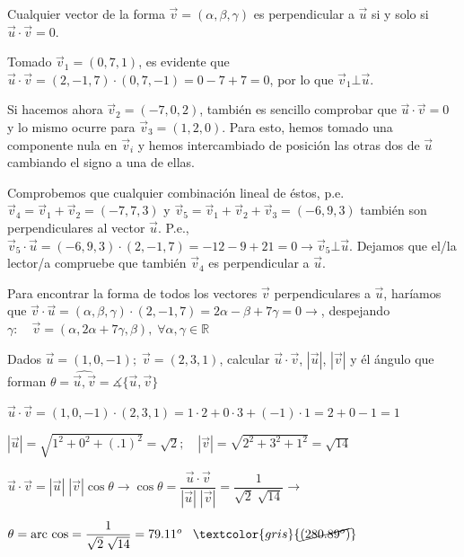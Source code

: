 \begin{proofw}\renewcommand{\qedsymbol}{$\diamond$}
	Cualquier vector de la forma $\vec v=(\alpha, \beta, \gamma)$ es perpendicular a $\vec u$ si y solo si $\vec u \cdot \vec v=0$.
	
	Tomado $\vec v_1=(0, 7, 1)$, es evidente que  $\vec u \cdot \vec v=(2,-1,7)\cdot (0,7,-1)=0-7+7=0$, por lo que $\vec v_1 \bot \vec u$.
	
	Si hacemos ahora  $\vec v_2=(-7,0,2)$, también es sencillo comprobar que $\vec u \cdot \vec v=0$ y lo mismo ocurre para $\vec v_3=(1,2,0)$. \textcolor{gris}{Para esto, hemos tomado una componente nula en $\vec v_i$ y hemos intercambiado de posición las otras dos de $\vec u$ cambiando el signo a una de ellas.}
	
	Comprobemos que cualquier combinación lineal de éstos, p.e. $\vec v_4=\vec v_1+\vec v_2=(-7,7,3)$ y $\vec v_5=\vec v_1+\vec v_2+\vec v_3=(-6,9,3)$ también son perpendiculares al vector $\vec u$. P.e., $\vec v_5 \cdot \vec u=(-6,9,3)\cdot (2,-1,7)=-12-9+21=0 \to \vec v_5 \bot \vec u$. Dejamos que el/la lector/a compruebe que también $\vec v_4$ es perpendicular a $\vec u$.
	
	\textcolor{gris}{Para encontrar la forma de todos los vectores $\vec v$ perpendiculares a $\vec u$, haríamos que $\vec v \cdot \vec u=(\alpha, \beta, \gamma)\cdot (2,-1,7)=2\alpha-\beta+7\gamma=0 \to$, despejando $\gamma: \quad  \vec v=(\alpha, 2\alpha+7\gamma, \beta),\; \forall \alpha, \gamma \in \mathbb R$}
\end{proofw}


\begin{ejre}
	Dados $\vec u=(1,0,-1); \; \vec v=(2,3,1)$, calcular $\vec u \cdot \vec v$, $|\vec u|$, $|\vec v|$ y él ángulo que forman $\theta =  \widehat{\vec u, \vec v}= \measuredangle \{\vec u, \vec v\} $
\end{ejre}

\begin{proofw}\renewcommand{\qedsymbol}{$\diamond$}
	$\vec u \cdot \vec v=(1,0,-1) \cdot (2,3,1)=1\cdot 2+0\cdot 3+(-1)\cdot 1=2+0-1=1$
	
	\noindent $|\vec u|=\sqrt{1^2+0^2+(.1)^2}=\sqrt{2}; \quad |\vec v|=\sqrt{2^2+3^2+1^2}=\sqrt{14}$
	
	\noindent $\vec u \cdot \vec v = |\vec u|\; |\vec v|\cos \theta \to \cos \theta = \dfrac {\vec u \cdot \vec v}{|\vec u|\; |\vec v|}=\dfrac {1}{\sqrt{2}\; \sqrt{14}} \to $
	
	\noindent $\theta = \text{arc cos} =\dfrac {1}{\sqrt{2}\; \sqrt{14}}= 79.11^o  \;\;\; \textcolor{gris}{\cancel{(280.89^o)}} $
\end{proofw}



